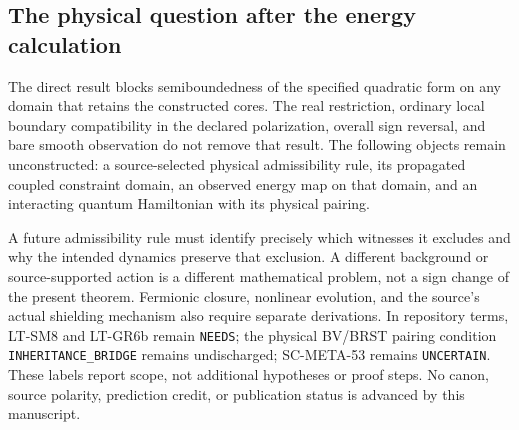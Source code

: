 \subsection{The physical question after the energy calculation}
The direct result blocks semiboundedness of the specified quadratic form
on any domain that retains the constructed cores. The real restriction,
ordinary local boundary compatibility in the declared polarization,
overall sign reversal, and bare smooth observation do not remove that
result. The following objects remain unconstructed: a source-selected
physical admissibility rule, its propagated coupled constraint domain,
an observed energy map on that domain, and an interacting quantum
Hamiltonian with its physical pairing.

A future admissibility rule must identify precisely which witnesses it
excludes and why the intended dynamics preserve that exclusion.
A different background or source-supported action is a different
mathematical problem, not a sign change of the present theorem.
Fermionic closure, nonlinear evolution, and the source's actual shielding
mechanism also require separate derivations. In repository terms,
LT-SM8 and LT-GR6b remain \texttt{NEEDS}; the physical BV/BRST pairing
condition \texttt{INHERITANCE\_BRIDGE} remains undischarged;
SC-META-53 remains \texttt{UNCERTAIN}. These labels report scope, not
additional hypotheses or proof steps. No canon, source polarity, prediction
credit, or publication status is advanced by this manuscript.

\appendix

